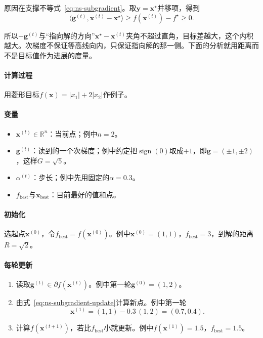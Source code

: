 原因在支撑不等式~\eqref{eq:ns-subgradient}。取$\bm{y}=\bm{x}^\star$并移项，得到
\begin{equation}
 \langle\bm{g}^{(t)},\bm{x}^{(t)}-\bm{x}^\star\rangle\geq f(\bm{x}^{(t)})-f^\star\geq0.
 \label{eq:ns-subgradient-angle}
\end{equation}

所以$-\bm{g}^{(t)}$与“指向解的方向”$\bm{x}^\star-\bm{x}^{(t)}$夹角不超过直角，目标差越大，这个内积越大。次梯度不保证等高线向内，只保证指向解的那一侧。下面的分析就用距离而不是目标值作为进展的度量。

\paragraph{计算过程}
用菱形目标$f(\bm{x})=\lvert x_1\rvert+2\lvert x_2\rvert$作例子。

\paragraph{变量}
\begin{itemize}
 \item $\bm{x}^{(t)}\in\mathbb{R}^n$：当前点；例中$n=2$。
 \item $\bm{g}^{(t)}$：读到的一个次梯度；例中约定把$\operatorname{sign}(0)$取成$+1$，即$\bm{g}=(\pm1,\pm2)$，这样$G=\sqrt5$。
 \item $\alpha^{(t)}$：步长；例中先用固定的$\alpha=0.3$。
 \item $f_{\mathrm{best}}$与$\bm{x}_{\mathrm{best}}$：目前最好的值和点。
\end{itemize}

\paragraph{初始化}
选起点$\bm{x}^{(0)}$，令$f_{\mathrm{best}}=f(\bm{x}^{(0)})$。例中$\bm{x}^{(0)}=(1,1)$，$f_{\mathrm{best}}=3$，到解的距离$R=\sqrt2$。

\paragraph{每轮更新}
\begin{enumerate}
 \item 读取$\bm{g}^{(t)}\in\partial f(\bm{x}^{(t)})$。例中第一轮$\bm{g}^{(0)}=(1,2)$。
 \item 由式~\eqref{eq:ns-subgradient-update}计算新点。例中第一轮
 \[
  \bm{x}^{(1)}=(1,1)-0.3\,(1,2)=(0.7,0.4).
 \]
 \item 计算$f(\bm{x}^{(t+1)})$，若比$f_{\mathrm{best}}$小就更新。例中$f(\bm{x}^{(1)})=1.5$，$f_{\mathrm{best}}=1.5$。
\end{enumerate}

